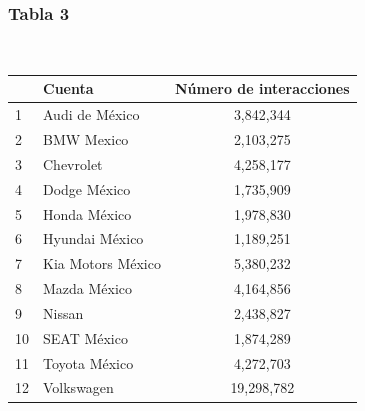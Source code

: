 \documentclass[a4paper,10pt]{article}
\begin{document}
\subsubsection{Tabla 3}

\begin{center}
  \\[0.3cm]
  \begin{tabular}{l|l|c}
    \hline
    & Cuenta & Número de interacciones \\
    \hline
    1 & Audi de México & 3,842,344 \\
    2 & BMW Mexico & 2,103,275 \\
    3 & Chevrolet & 4,258,177 \\
    4 & Dodge México & 1,735,909 \\
    5 & Honda México & 1,978,830 \\
    6 & Hyundai México & 1,189,251 \\
    7 & Kia Motors México & 5,380,232 \\
    8 & Mazda México & 4,164,856 \\
    9 & Nissan & 2,438,827 \\
    10 & SEAT México & 1,874,289 \\
    11 & Toyota México & 4,272,703 \\
    12 & Volkswagen & 19,298,782 \\
    \hline
  \end{tabular}
\end{center}
\end{document}
